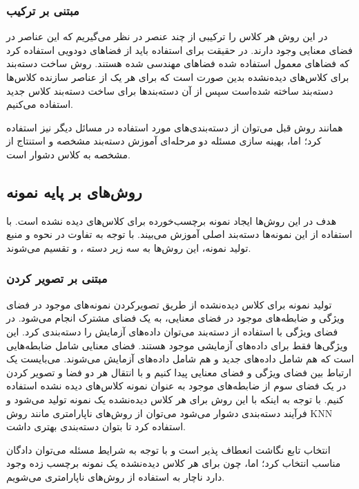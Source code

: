 \subsubsection{مبتنی بر ترکیب‌}
در این روش هر کلاس را ترکیبی از چند عنصر در نظر می‌گیریم که این عناصر در فضای معنایی وجود دارند. در حقیقت برای استفاده باید از فضاهای دودویی استفاده کرد که فضاهای معمول استفاده شده فضاهای مهندسی شده هستند. روش ساخت دسته‌بند برای کلاس‌های دیده‌نشده بدین صورت است که برای هر یک از عناصر سازنده کلاس‌ها دسته‌بند ساخته شده‌‌است سپس از آن دسته‌بند‌ها برای ساخت دسته‌بند کلاس جدید استفاده می‌کنیم.

همانند روش قبل می‌توان از دسته‌بندی‌های مورد استفاده در مسائل دیگر نیز استفاده کرد؛ اما، بهینه سازی مسئله دو مرحله‌ای آموزش دسته‌بند مشخصه و استنتاج از مشخصه به کلاس  دشوار است.

\subsection{روش‌‌های بر پایه نمونه}
هدف در این روش‌‌ها ایجاد نمونه برچسب‌خورده برای کلاس‌های دیده نشده است. با استفاده از این نمونه‌ها دسته‌بند اصلی آموزش می‌بیند. با توجه به تفاوت در نحوه و منبع تولید نمونه،‌ این روش‌‌ها به سه زیر دسته 
، 
 و 
تقسیم می‌شوند.
\subsubsection{مبتنی بر تصویر کردن‌}
تولید نمونه برای کلاس دیده‌نشده از طریق تصویرکردن نمونه‌های موجود در فضای ویژگی و ضابطه‌های موجود در فضای معنایی، به یک فضای مشترک انجام می‌شود. در فضای ویژگی با استفاده از دسته‌بند می‌توان داده‌های آزمایش را دسته‌بندی کرد. این ویژگی‌ها فقط برای داده‌های آزمایشی موجود هستند. فضای معنایی شامل ضابطه‌هایی است که هم شامل داده‌های جدید و هم شامل داده‌های آزمایش می‌شوند. می‌بایست یک ارتباط بین فضای ویژگی و فضای معنایی پیدا کنیم و با انتقال هر دو فضا و تصویر کردن در یک فضای سوم از ضابطه‌های موجود به عنوان نمونه کلاس‌های دیده نشده استفاده کنیم. با توجه به اینکه با این روش برای هر کلاس دیده‌نشده یک نمونه تولید می‌شود و فرآیند دسته‌بندی دشوار می‌شود می‌توان از  روش‌های ناپارامتری مانند روش KNN استفاده کرد تا بتوان دسته‌بندی بهتری داشت.

انتخاب تابع نگاشت انعطاف پذیر است و با توجه به شرایط مسئله می‌توان دادگان مناسب انتخاب کرد؛ اما، چون برای هر کلاس دیده‌نشده یک نمونه برچسب زده وجود دارد ناچار به استفاده از روش‌های ناپارامتری می‌شویم.

